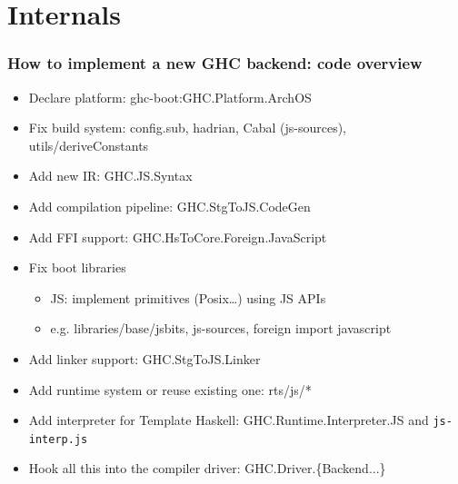 \documentclass[aspectratio=169]{beamer}
\begin{document}
%


\section{Internals}


\begin{frame}
  \frametitle{How to implement a new GHC backend: code overview}
  \begin{itemize}
\item Declare platform: ghc-boot:GHC.Platform.ArchOS
\item Fix build system: config.sub, hadrian, Cabal (js-sources),
  utils/deriveConstants
\item Add new IR: GHC.JS.Syntax
\item Add compilation pipeline: GHC.StgToJS.CodeGen
\item Add FFI support: GHC.HsToCore.Foreign.JavaScript
\item Fix boot libraries
  \begin{itemize}
\item JS: implement primitives (Posix…) using JS APIs
\item e.g. libraries/base/jsbits, js-sources, foreign import javascript
  \end{itemize}
\item Add linker support: GHC.StgToJS.Linker
\item Add runtime system or reuse existing one: rts/js/*
\item Add interpreter for Template Haskell: GHC.Runtime.Interpreter.JS and
  \texttt{js-interp.js}
\item Hook all this into the compiler driver: GHC.Driver.\{Backend...\}
\end{itemize}
\end{frame}
\end{document}
